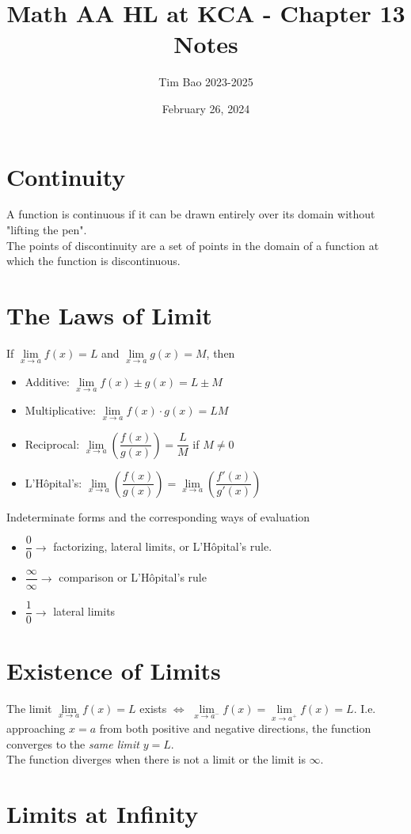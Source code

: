\documentclass[11pt]{article}
\title{Math AA HL at KCA - Chapter 13 Notes}
\author{Tim Bao 2023-2025}
\date{February 26, 2024}
\newcommand{\lb}{\\[8pt]}
\begin{document}
\maketitle
\pagebreak
\tableofcontents
\pagebreak

\section{Continuity}

A function is continuous if it can be drawn entirely over its domain without "lifting the pen".\lb
The points of discontinuity are a set of points in the domain of a function at which the function is discontinuous.

\pagebreak

\section{The Laws of Limit}

If $\lim\limits_{x\to a}{f(x)} = L$ and $\lim\limits_{x\to a}{g(x)} = M$, then
\begin{itemize}
  \item Additive: $\lim\limits_{x\to a}{f(x) \pm g(x)} = L\pm M$
  \item Multiplicative: $\lim\limits_{x\to a}{f(x) \cdot g(x)} = LM$
  \item Reciprocal: $\lim\limits_{x\to a}\left(\dfrac{f(x)}{g(x)}\right) = \dfrac{L}{M}$ if $M \not = 0$
  \item L'Hôpital's: $\lim\limits_{x\to a}\left(\dfrac{f(x)}{g(x)}\right) = \lim\limits_{x\to a}\left(\dfrac{f'(x)}{g'(x)}\right)$
\end{itemize}
\bigskip
Indeterminate forms and the corresponding ways of evaluation
\begin{itemize}
  \item $\dfrac{0}{0} \longrightarrow$ factorizing, lateral limits, or L'Hôpital's rule.
  \item $\dfrac{\infty}{\infty} \longrightarrow$ comparison or L'Hôpital's rule
  \item $\dfrac{1}{0} \longrightarrow$ lateral limits
\end{itemize}

\section{Existence of Limits}
The limit $\lim\limits_{x\to a}{f(x)} = L$ exists $\iff$ $\lim\limits_{x\to a^-}{f(x)} = \lim\limits_{x\to a^+}{f(x)} = L$. I.e. approaching $x = a$ from both positive and negative directions, the function converges to the \textit{same limit} $y = L$.\lb
The function diverges when there is not a limit or the limit is $\infty$.

\pagebreak

\section{Limits at Infinity}
\end{document}
